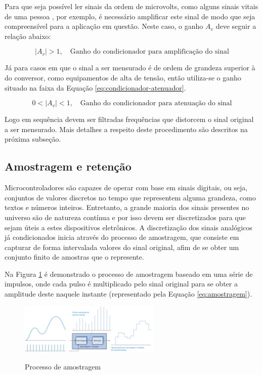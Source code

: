 \documentclass[oneside,openright,12pt]{ufsm_2015} %
\begin{document}
Para que seja possível ler sinais da ordem de microvolts, como alguns sinais vitais de uma pessoa \cite{zhang2014signal}, por exemplo, é necessário amplificar este sinal de modo que seja compreensível para a aplicação em questão. Neste caso, o ganho $A_{v}$ deve seguir a relação abaixo: 

\begin{equation}\label{eq:condicionador-amplificador}
    |A_{v}| > 1,\quad \text{Ganho do condicionador para amplificação do sinal}    
\end{equation}

Já para casos em que o sinal a ser mensurado é de ordem de grandeza superior à do conversor, como equipamentos de alta de tensão, então utiliza-se o ganho situado na faixa da Equação \ref{eq:condicionador-atenuador}.

\begin{equation}\label{eq:condicionador-atenuador}
    0 < |A_{v}| < 1,\quad \text{Ganho do condicionador para atenuação do sinal}    
\end{equation}

Logo em sequência devem ser filtradas frequências que distorcem o sinal original a ser mensurado. Mais detalhes a respeito deste procedimento são descritos na próxima subseção.

\subsection{Amostragem e retenção}
Microcontroladores são capazes de operar com base em sinais digitais, ou seja, conjuntos de valores discretos no tempo que representem alguma grandeza, como textos e números inteiros. Entretanto, a grande maioria dos sinais presentes no universo são de natureza contínua e por isso devem ser discretizados para que sejam úteis a estes dispositivos eletrônicos. A discretização dos sinais analógicos já condicionados inicia através do processo de amostragem, que consiste em capturar de forma intervalada valores do sinal original, afim de se obter um conjunto finito de amostras que o represente.

Na Figura \ref{fig:processo-de-amostragem} é demonstrado o processo de amostragem baseado em uma série de impulsos, onde cada pulso é multiplicado pelo sinal original para se obter a amplitude deste naquele instante (representado pela Equação \ref{eq:amostragem}). 

\begin{figure}[ht]
    \caption{\label{exepretex} Processo de amostragem}
    \centering
    \includegraphics[width=0.6\textwidth]{figuras/sample-and-hold.png}
    \vspace{\baselineskip} %
        \label{fig:processo-de-amostragem}
\end{figure}
\end{document}
